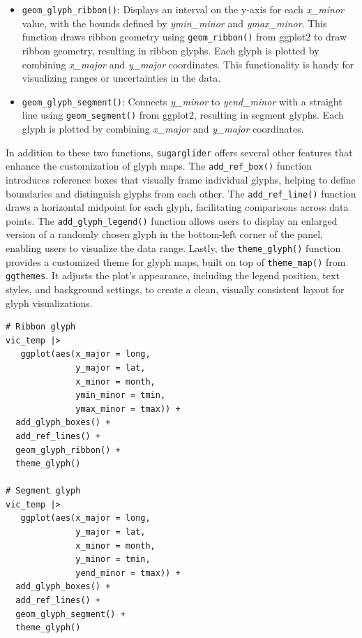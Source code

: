 \begin{itemize}
\item
  \texttt{geom\_glyph\_ribbon()}: Displays an interval on the y-axis for each \emph{x\_minor} value, with the bounds defined by \emph{ymin\_minor} and \emph{ymax\_minor}. This function draws ribbon geometry using \texttt{geom\_ribbon()} from ggplot2 to draw ribbon geometry, resulting in ribbon glyphs. Each glyph is plotted by combining \emph{x\_major} and \emph{y\_major} coordinates. This functionality is handy for visualizing ranges or uncertainties in the data.
\item
  \texttt{geom\_glyph\_segment()}: Connects \emph{y\_minor} to \emph{yend\_minor} with a straight line using \texttt{geom\_segment()} from ggplot2, resulting in segment glyphs. Each glyph is plotted by combining \emph{x\_major} and \emph{y\_major} coordinates.
\end{itemize}

In addition to these two functions, \texttt{sugarglider} offers several other features that enhance the customization of glyph maps. The \texttt{add\_ref\_box()} function introduces reference boxes that visually frame individual glyphs, helping to define boundaries and distinguish glyphs from each other. The \texttt{add\_ref\_line()} function draws a horizontal midpoint for each glyph, facilitating comparisons across data points. The \texttt{add\_glyph\_legend()} function allows users to display an enlarged version of a randomly chosen glyph in the bottom-left corner of the panel, enabling users to visualize the data range. Lastly, the \texttt{theme\_glyph()} function provides a customized theme for glyph maps, built on top of \texttt{theme\_map()} from \texttt{ggthemes}. It adjusts the plot's appearance, including the legend position, text styles, and background settings, to create a clean, visually consistent layout for glyph visualizations.

\begin{verbatim}
# Ribbon glyph
vic_temp |>
   ggplot(aes(x_major = long,
              y_major = lat,
              x_minor = month,
              ymin_minor = tmin,
              ymax_minor = tmax)) +
  add_glyph_boxes() +
  add_ref_lines() +
  geom_glyph_ribbon() +
  theme_glyph()

# Segment glyph
vic_temp |>
   ggplot(aes(x_major = long,
              y_major = lat,
              x_minor = month,
              y_minor = tmin,
              yend_minor = tmax)) +
  add_glyph_boxes() +
  add_ref_lines() +
  geom_glyph_segment() +
  theme_glyph()
\end{verbatim}

